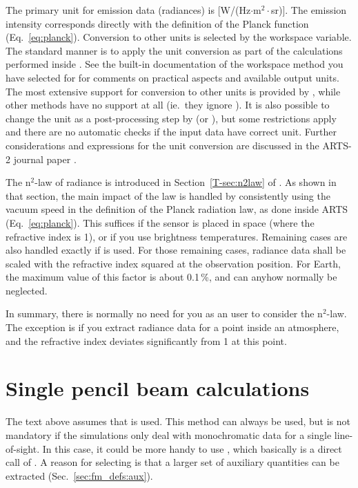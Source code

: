 The primary unit for emission data (radiances) is [W/(Hz$\cdot$m$^2\cdot$sr)].
The emission intensity corresponds directly with the definition of the Planck
function (Eq.~\ref{eq:planck}). Conversion to other units is selected by the
 workspace variable. The standard manner is to apply the
unit conversion as part of the calculations performed inside
. See the built-in documentation of the workspace method you
have selected for  for comments on practical
aspects and available output units. The most extensive support for conversion
to other units is provided by , while other
methods have no support at all (ie.\ they ignore ). It is
also possible to change the unit as a post-processing step by
 (or ), but some restrictions apply
and there are no automatic checks if the input data have correct unit. Further
considerations and expressions for the unit conversion are discussed in the
ARTS-2 journal paper \citep[][Sec.~5.7]{eriksson:arts2:11}.

The n$^2$-law of radiance is introduced in
Section~\ref{T-sec:n2law} of \theory. As shown in that section, the main impact
of the law is handled by consistently using the vacuum speed in the definition
of the Planck radiation law, as done inside ARTS (Eq.~\ref{eq:planck}). This
suffices if the sensor is placed in space (where the refractive index is 1), or
if you use brightness temperatures. Remaining cases are also handled exactly if
 is used. For those remaining cases, radiance
data shall be scaled with the refractive index squared at the observation
position. For Earth, the maximum value of this factor is about 0.1\,\%, and can
anyhow normally be neglected.

In summary, there is normally no need for you as an user to consider the
n$^2$-law. The exception is if you extract radiance data for a point inside an
atmosphere, and the refractive index deviates significantly from 1 at this
point.




\section{Single pencil beam calculations}
\label{sec:fm_defs:single_beams}

The text above assumes that  is used. This method can always be
used, but  is not mandatory if the simulations only deal with
monochromatic data for a single line-of-sight. In this case, it could be more
handy to use , which basically is a direct call of
. A reason for selecting  is that
a larger set of auxiliary quantities can be extracted
(Sec.~\ref{sec:fm_defs:aux}). 

